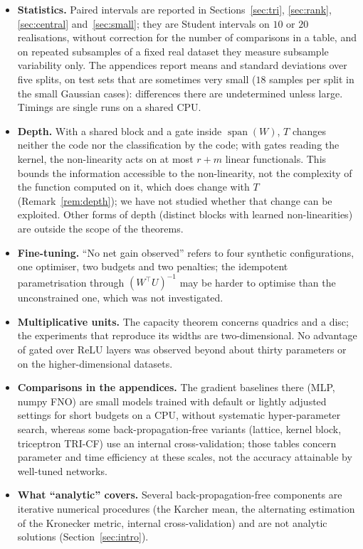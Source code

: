 \documentclass[11pt,a4paper]{article}
\theoremstyle{plain}
\theoremstyle{definition}
\theoremstyle{remark}
\newcommand{\spn}{\operatorname{span}}
\newcommand{\T}{\top}
\begin{document}
\begin{itemize}
  \item \textbf{Statistics.} Paired intervals are reported in
  Sections~\ref{sec:tri}, \ref{sec:rank}, \ref{sec:central}
  and~\ref{sec:small}; they are Student intervals on $10$ or $20$
  realisations, without correction for the number of comparisons in a
  table, and on repeated subsamples of a fixed real dataset they measure
  subsample variability only. The appendices report means and standard
  deviations over five splits, on test sets that are sometimes very small
  ($18$ samples per split in the small Gaussian cases): differences there
  are undetermined unless large. Timings are single runs on a shared CPU.
  \item \textbf{Depth.} With a shared block and a gate inside $\spn(W)$, $T$
  changes neither the code nor the classification by the code; with gates
  reading the kernel, the non-linearity acts on at most $r+m$ linear
  functionals. This bounds the information accessible to the non-linearity,
  not the complexity of the function computed on it, which does change with
  $T$ (Remark~\ref{rem:depth}); we have not studied whether that change can
  be exploited. Other forms of depth (distinct blocks with learned
  non-linearities) are outside the scope of the theorems.
  \item \textbf{Fine-tuning.} ``No net gain observed'' refers to four
  synthetic configurations, one optimiser, two budgets and two penalties;
  the idempotent parametrisation through $(W^\T U)^{-1}$ may be harder to
  optimise than the unconstrained one, which was not investigated.
  \item \textbf{Multiplicative units.} The capacity theorem concerns
  quadrics and a disc; the experiments that reproduce its widths are
  two-dimensional. No advantage of gated over ReLU layers was observed
  beyond about thirty parameters or on the higher-dimensional datasets.
  \item \textbf{Comparisons in the appendices.} The gradient baselines
  there (MLP, numpy FNO) are small models trained with default or lightly
  adjusted settings for short budgets on a CPU, without systematic
  hyper-parameter search, whereas some back-propagation-free variants
  (lattice, kernel block, triceptron TRI-CF) use an internal
  cross-validation; those tables concern parameter and time efficiency at
  these scales, not the accuracy attainable by well-tuned networks.
  \item \textbf{What ``analytic'' covers.} Several back-propagation-free
  components are iterative numerical procedures (the Karcher mean, the
  alternating estimation of the Kronecker metric, internal
  cross-validation) and are not analytic solutions
  (Section~\ref{sec:intro}).
\end{itemize}
\end{document}
